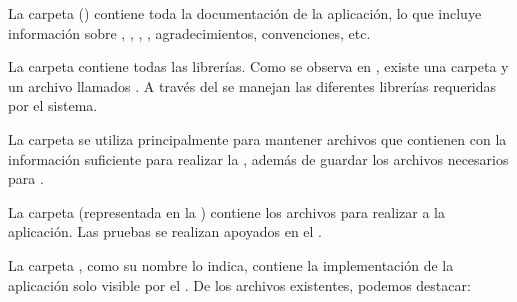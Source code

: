 

La carpeta \folderDocs () contiene toda la documentación de la aplicación, lo que incluye información sobre \deploymentCPT, \packagesAS, \routingAS, \templatesMETEOR, agradecimientos, convenciones, etc.



La carpeta \folderLib contiene todas las librerías. Como se observa en , existe una carpeta y un archivo \jsonNAME llamados \folderBower. A través del \packagesAS \nameBower se manejan las diferentes librerías requeridas por el sistema.



La carpeta \privateFolder se utiliza principalmente para mantener archivos \jsonNAME que contienen \collectionsMETEOR con la información suficiente para realizar la \localisationPC, además de guardar los archivos necesarios para \fixturesPC.



La carpeta \folderTests (representada en la ) contiene los archivos para realizar \testingCPT a la aplicación. Las pruebas se realizan apoyados en el \packageAS \sanjoJasminePackage.



La carpeta \serverFolder, como su nombre lo indica, contiene la implementación de la aplicación solo visible por el \serverSideAS. De los archivos existentes, podemos destacar:

